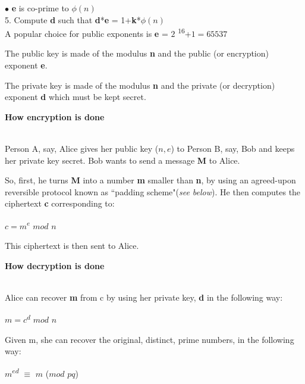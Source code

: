 \documentclass[12 pt]{article}
\begin{document}
\hspace{16.18 pt} {$\bullet$ \textbf{e} is co-prime to \boldmath $\phi(n)$\\[3 pt]

5. Compute \textbf{d} such that \boldmath \textbf{d}*\textbf{e} = 1+\textbf{k}*\boldmath $\phi(n)$
\bigskip
\\
A popular choice for public exponents is \textbf{e} = $2$ \textsuperscript{$16$}+$1 = 65537$\bigskip

\noindent The public key is made of the modulus \textbf{n} and the public (or encryption) exponent \textbf{e}.

\noindent The private key is made of the modulus \textbf{n} and the private (or decryption) exponent \textbf{d} which must be kept secret.

\pagebreak

\begin{LARGE}
\noindent \textbf{How encryption is done}
\end{LARGE}\\[12 pt]

\noindent Person A, say, Alice gives her public key ($n,e$) to Person B, say, Bob and keeps her private key secret. Bob wants to send a message \textbf{M} to Alice.

\noindent So, first, he turns \textbf{M} into a number \textbf{m} smaller than \textbf{n}, by using an agreed-upon reversible protocol known as ``padding scheme"(\emph{see below}). He then computes the ciphertext \textbf{c} corresponding to:

$c = m$\textsuperscript{$e$} $mod$ $n$
\bigskip

\noindent This ciphertext is then sent to Alice.
\\[22 pt]

\begin{LARGE}
\noindent \textbf{How decryption is done}
\end{LARGE}\\[12 pt]

\noindent Alice can recover \textbf{m} from c by using her private key, \textbf{d} in the following way: \bigskip

$m = c$\textsuperscript{$d$} $mod$ $n$
\bigskip

\noindent Given m, she can recover the original, distinct, prime numbers, in the following way: \bigskip

$m$\textsuperscript{$ed$} $\equiv$ $m$ \hspace{66 pt} ($mod$ $pq$)\bigskip

}
\end{document}
